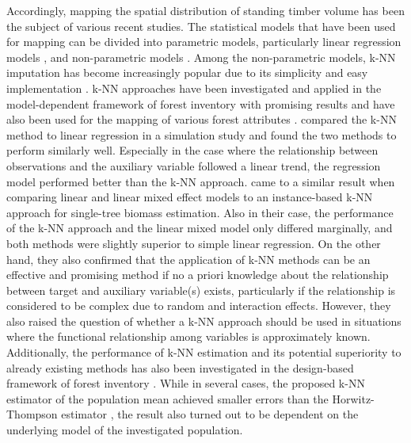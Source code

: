 Accordingly, mapping the spatial distribution of standing timber volume has been the subject of various recent studies. The statistical models that have been used for mapping can be divided into parametric models, particularly linear regression models \citep{tonolli2011, vanaardt2008}, and non-parametric models \citep{franco2001, latifi2010, nothdurft2009}. Among the non-parametric models, k-NN imputation has become increasingly popular due to its simplicity and easy implementation \citep{magnussen2014}. k-NN approaches have been investigated and applied in the model-dependent framework of forest inventory with promising results \citep{mcroberts2007} and have also been used for the mapping of various forest attributes \citep{beaudoin2014, chirici2012, tomppo2006}. \citet{haara2012} compared the k-NN method to linear regression in a simulation study and found the two methods to perform similarly well. Especially in the case where the relationship between observations and the auxiliary variable followed a linear trend, the regression model performed better than the k-NN approach. \citet{fehrmann2008} came to a similar result when comparing linear and linear mixed effect models to an instance-based k-NN approach for single-tree biomass estimation. Also in their case, the performance of the k-NN approach and the linear mixed model only differed marginally, and both methods were slightly superior to simple linear regression. On the other hand, they also confirmed that the application of k-NN methods can be an effective and promising method if no a priori knowledge about the relationship between target and auxiliary variable(s) exists, particularly if the relationship is considered to be complex due to random and interaction effects. However, they also raised the question of whether a k-NN approach should be used in situations where the functional relationship among variables is approximately known. Additionally, the performance of k-NN estimation and its potential superiority to already existing methods has also been investigated in the design-based framework of forest inventory \citep{baffetta2010, baffetta2009}. While in several cases, the proposed k-NN estimator of the population mean achieved smaller errors than the Horwitz-Thompson estimator \citep{mandallaz2008}, the result also turned out to be dependent on the underlying model of the investigated population.\par
